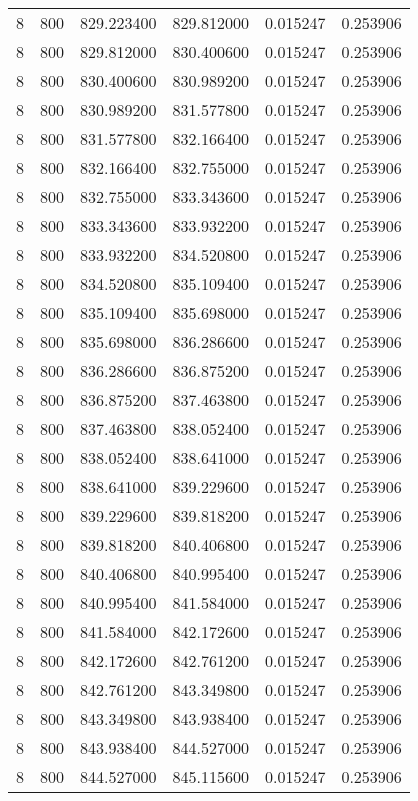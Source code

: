 \begin{longtable}{rrrrrr}
8 & 800 & 829.223400 & 829.812000 & 0.015247 & 0.253906 \\
8 & 800 & 829.812000 & 830.400600 & 0.015247 & 0.253906 \\
8 & 800 & 830.400600 & 830.989200 & 0.015247 & 0.253906 \\
8 & 800 & 830.989200 & 831.577800 & 0.015247 & 0.253906 \\
8 & 800 & 831.577800 & 832.166400 & 0.015247 & 0.253906 \\
8 & 800 & 832.166400 & 832.755000 & 0.015247 & 0.253906 \\
8 & 800 & 832.755000 & 833.343600 & 0.015247 & 0.253906 \\
8 & 800 & 833.343600 & 833.932200 & 0.015247 & 0.253906 \\
8 & 800 & 833.932200 & 834.520800 & 0.015247 & 0.253906 \\
8 & 800 & 834.520800 & 835.109400 & 0.015247 & 0.253906 \\
8 & 800 & 835.109400 & 835.698000 & 0.015247 & 0.253906 \\
8 & 800 & 835.698000 & 836.286600 & 0.015247 & 0.253906 \\
8 & 800 & 836.286600 & 836.875200 & 0.015247 & 0.253906 \\
8 & 800 & 836.875200 & 837.463800 & 0.015247 & 0.253906 \\
8 & 800 & 837.463800 & 838.052400 & 0.015247 & 0.253906 \\
8 & 800 & 838.052400 & 838.641000 & 0.015247 & 0.253906 \\
8 & 800 & 838.641000 & 839.229600 & 0.015247 & 0.253906 \\
8 & 800 & 839.229600 & 839.818200 & 0.015247 & 0.253906 \\
8 & 800 & 839.818200 & 840.406800 & 0.015247 & 0.253906 \\
8 & 800 & 840.406800 & 840.995400 & 0.015247 & 0.253906 \\
8 & 800 & 840.995400 & 841.584000 & 0.015247 & 0.253906 \\
8 & 800 & 841.584000 & 842.172600 & 0.015247 & 0.253906 \\
8 & 800 & 842.172600 & 842.761200 & 0.015247 & 0.253906 \\
8 & 800 & 842.761200 & 843.349800 & 0.015247 & 0.253906 \\
8 & 800 & 843.349800 & 843.938400 & 0.015247 & 0.253906 \\
8 & 800 & 843.938400 & 844.527000 & 0.015247 & 0.253906 \\
8 & 800 & 844.527000 & 845.115600 & 0.015247 & 0.253906 \\

\end{longtable}
